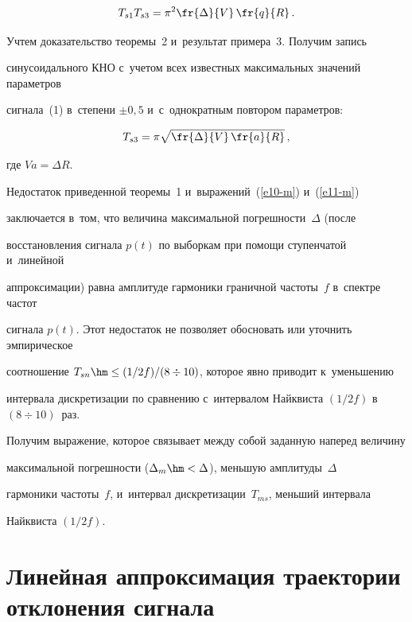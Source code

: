   $$


  T_{s1} T_{s3}=\pi^2\fr{\Delta}{V}\,\fr{q}{R}\,.


  $$ 


  Учтем доказательство теоремы~2 и~результат примера~3. Получим запись 


синусоидального КНО с~учетом всех известных максимальных значений параметров 


сигнала~(1) в~степени $\pm0{,}5$ и~с~однократным повтором параметров: 


  $$


  T_{s3}= \pi \sqrt{\fr{\Delta}{V}\,\fr{a}{R}}\,,


  $$ 


  где $Va=\Delta R$.


  


  \smallskip


  


  Недостаток приведенной теоремы~1 и~выражений~(\ref{e10-m}) и~(\ref{e11-m}) 


заключается в~том, что величина максимальной погрешности~$\Delta$ (после 


восстановления сигнала $p(t)$ по выборкам при помощи ступенчатой и~линейной 


аппроксимации) равна амплитуде гармоники граничной частоты~$f$ в~спектре частот 


сигнала $p(t)$. Этот недостаток не позволяет обосновать или уточнить эмпирическое 


соотношение $T_{sn}\hm\leq (1/2f)/(8\div10)$, которое явно приводит к~уменьшению 


интервала дискретизации по сравнению с~интервалом Найквиста $(1/2f)$ в~$(8\div10)$~раз. 


  


  Получим выражение, которое связывает между собой заданную наперед величину 


максимальной погрешности ($\Delta_m\hm<\Delta$), меньшую амплитуды~$\Delta$ 


гармоники частоты~$f$, и~интервал дискретизации~$T_{ms}$, меньший интервала 


Найквиста $(1/2f)$.


  


  \section{Линейная аппроксимация траектории отклонения сигнала }


